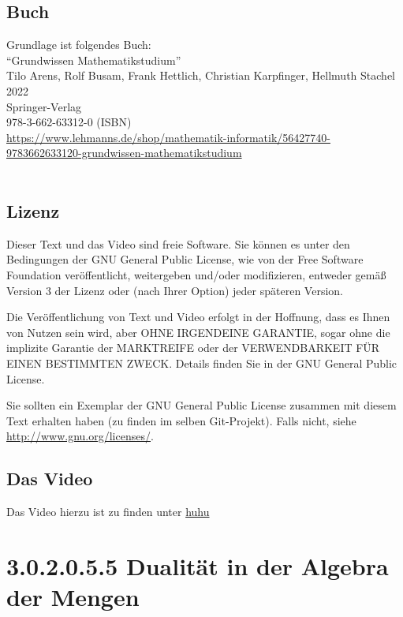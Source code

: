 \documentclass[a4paper]{amsart}
\theoremstyle{definition}
\begin{document}
\subsection*{Buch}
Grundlage ist folgendes Buch:\\
"`Grundwissen Mathematikstudium"'\\
Tilo Arens, Rolf Busam, Frank Hettlich, Christian Karpfinger, Hellmuth Stachel \\
2022\\
Springer-Verlag\\
978-3-662-63312-0 (ISBN)\\
{\tiny
   \url{https://www.lehmanns.de/shop/mathematik-informatik/56427740-9783662633120-grundwissen-mathematikstudium}}\\
\\

\subsection*{Lizenz}
Dieser Text und das Video sind freie Software. Sie können es unter den Bedingungen der
GNU General Public License, wie von der Free Software Foundation veröffentlicht, weitergeben
und/oder modifizieren, entweder gemäß Version 3 der Lizenz oder (nach Ihrer Option) jeder späteren Version.

Die Veröffentlichung von Text und Video erfolgt in der Hoffnung, dass es Ihnen von Nutzen sein wird,
aber OHNE IRGENDEINE GARANTIE, sogar ohne die implizite Garantie der MARKTREIFE oder der
VERWENDBARKEIT FÜR EINEN BESTIMMTEN ZWECK. Details finden Sie in der GNU General Public License.

Sie sollten ein Exemplar der GNU General Public License zusammen mit diesem Text erhalten haben
(zu finden im selben Git-Projekt).
Falls nicht, siehe \url{http://www.gnu.org/licenses/}.

\subsection*{Das Video}
Das Video hierzu ist zu finden unter
{\tiny
   \url{huhu}
}

\section{3.0.2.0.5.5 Dualität in der Algebra der Mengen}
\end{document}
